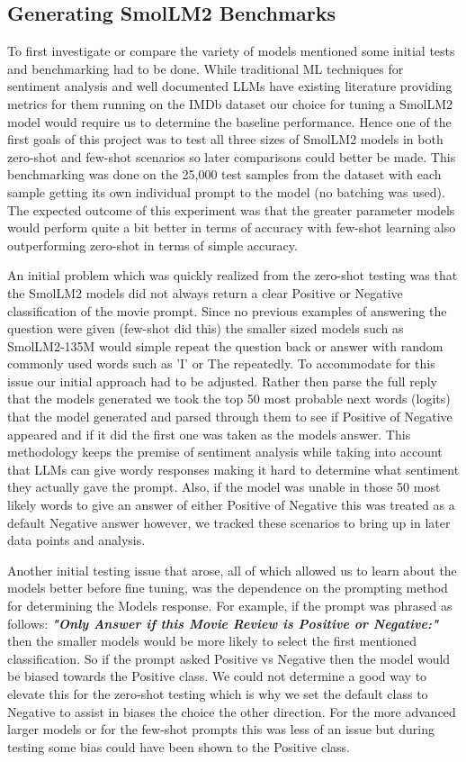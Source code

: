 \documentclass[10pt,twocolumn,letterpaper]{article}
\begin{document}
\subsection{Generating SmolLM2 Benchmarks}
To first investigate or compare the variety of models mentioned some initial tests and benchmarking had to be done. While traditional ML techniques for sentiment analysis and well documented LLMs have existing literature providing metrics for them running on the IMDb dataset \cite{IMDB-dataset} our choice for tuning a SmolLM2 model would require us to determine the baseline performance. Hence one of the first goals of this project was to test all three sizes of SmolLM2 models in both zero-shot and few-shot scenarios so later comparisons could better be made. This benchmarking was done on the 25,000 test samples from the dataset with each sample getting its own individual prompt to the model (no batching was used). The expected outcome of this experiment was that the greater parameter models would perform quite a bit better in terms of accuracy with few-shot learning also outperforming zero-shot in terms of simple accuracy. 

An initial problem which was quickly realized from the zero-shot testing was that the SmolLM2 models did not always return a clear Positive or Negative classification of the movie prompt. Since no previous examples of answering the question were given (few-shot did this) the smaller sized models such as SmolLM2-135M would simple repeat the question back or answer with random commonly used words such as 'I' or The repeatedly. To accommodate for this issue our initial approach had to be adjusted. Rather then parse the full reply that the models generated we took the top 50 most probable next words (logits) that the model generated and parsed through them to see if Positive of Negative appeared and if it did the first one was taken as the models answer. This methodology keeps the premise of sentiment analysis while taking into account that LLMs can give wordy responses making it hard to determine what sentiment they actually gave the prompt. Also, if the model was unable in those 50 most likely words to give an answer of either Positive of Negative this was treated as a default Negative answer however, we tracked these scenarios to bring up in later data points and analysis. 

Another initial testing issue that arose, all of which allowed us to learn about the models better before fine tuning, was the dependence on the prompting method for determining the Models response. For example, if the prompt was phrased as follows: \textit{\textbf{"Only Answer if this Movie Review is Positive or Negative:"}} then the smaller models would be more likely to select the first mentioned classification. So if the prompt asked Positive vs Negative then the model would be biased towards the Positive class. We could not determine a good way to elevate this for the zero-shot testing which is why we set the default class to Negative to assist in biases the choice the other direction. For the more advanced larger models or for the few-shot prompts this was less of an issue but during testing some bias could have been shown to the Positive class. 
\end{document}
